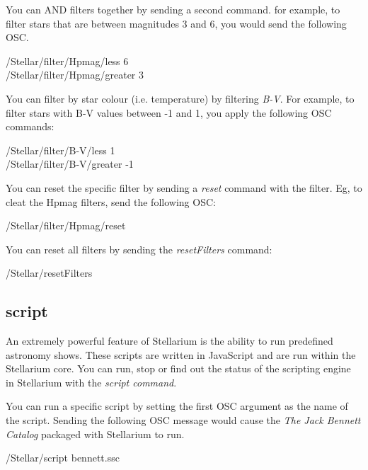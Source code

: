 You can AND filters together by sending a second command. for example, to filter stars that are between magnitudes 3 and 6, you would send the following OSC.
    \begin{syntax}	 
	\medskip
	/Stellar/filter/Hpmag/less 6\\
	/Stellar/filter/Hpmag/greater 3
	\medskip
\end{syntax}  

You can filter by star colour (i.e. temperature) by filtering \textit{B-V}. For example, to filter stars with  B-V values between -1 and 1, you apply the following OSC commands:  
     \begin{syntax}	   
 	\medskip
 	/Stellar/filter/B-V/less 1\\
 	/Stellar/filter/B-V/greater -1
 	\medskip
\end{syntax}  

You can reset the specific filter by sending a \textit{reset} command with the filter. Eg, to cleat the Hpmag filters, send the following OSC:  
    \begin{syntax}	
	\medskip
	/Stellar/filter/Hpmag/reset
	\medskip
\end{syntax}  
	\medskip

You can reset all filters by sending the \textit{resetFilters} command: 
	\medskip
\begin{syntax}	
	\medskip
	/Stellar/resetFilters
	\medskip
\end{syntax}  
	\medskip
\subsection{script}\label{sec:scriptcommand}  
An extremely powerful feature of Stellarium is the ability to run predefined astronomy shows. These scripts are written in JavaScript and are run within the Stellarium core. You can run, stop or find out the status of the scripting engine in Stellarium with the \textit{script command}.

You can run a specific script by setting the first OSC argument as the name of the script. Sending the following OSC message would cause the \textit{The Jack Bennett Catalog} packaged with Stellarium to run.
\begin{syntax}	
	\medskip
	/Stellar/script bennett.ssc
	\medskip
\end{syntax}  
	\medskip
	
